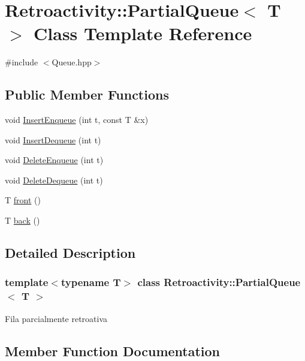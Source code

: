 \hypertarget{classRetroactivity_1_1PartialQueue}{}\section{Retroactivity\+:\+:Partial\+Queue$<$ T $>$ Class Template Reference}
\label{classRetroactivity_1_1PartialQueue}


{\ttfamily \#include $<$Queue.\+hpp$>$}

\subsection*{Public Member Functions}
\begin{DoxyCompactItemize}
\item 
void \hyperlink{classRetroactivity_1_1PartialQueue_a257afb4736ee36bcde458fda072fe9e7}{Insert\+Enqueue} (int t, const T \&x)
\item 
void \hyperlink{classRetroactivity_1_1PartialQueue_a5ad20b8de3b387557e9dfa67088353a8}{Insert\+Dequeue} (int t)
\item 
void \hyperlink{classRetroactivity_1_1PartialQueue_a467666a5abfb3c739addfe128583eb4b}{Delete\+Enqueue} (int t)
\item 
void \hyperlink{classRetroactivity_1_1PartialQueue_ae44ce14220e3c46a37d151d880f01167}{Delete\+Dequeue} (int t)
\item 
T \hyperlink{classRetroactivity_1_1PartialQueue_a54a86b012bd72869e2635c6b02ca71f9}{front} ()
\item 
T \hyperlink{classRetroactivity_1_1PartialQueue_a5fc143093c1b667dcc0480449fd0c9e5}{back} ()
\end{DoxyCompactItemize}


\subsection{Detailed Description}
\subsubsection*{template$<$typename T$>$\newline
class Retroactivity\+::\+Partial\+Queue$<$ T $>$}

Fila parcialmente retroativa 

\subsection{Member Function Documentation}
\mbox{\label{classRetroactivity_1_1PartialQueue_a5fc143093c1b667dcc0480449fd0c9e5}} 
